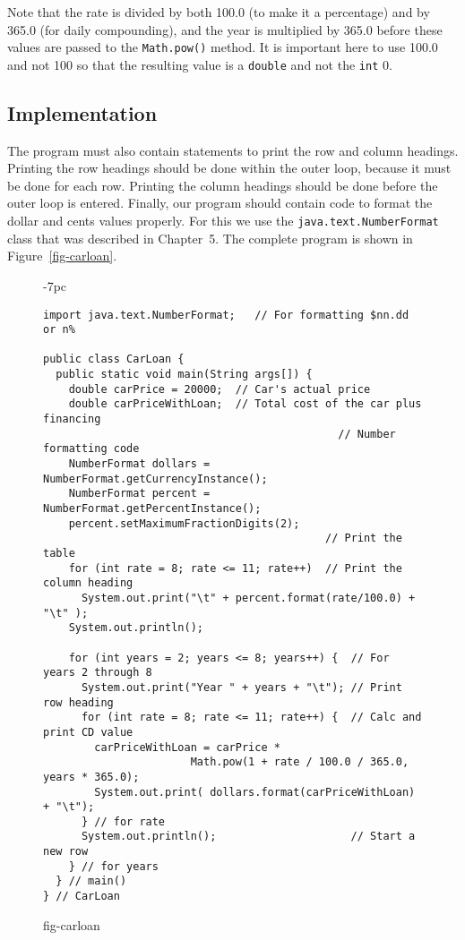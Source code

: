 \noindent Note that the rate is divided by both 100.0 (to make it
a percentage) and by 365.0 (for daily compounding), and the year
is multiplied by 365.0 before these values are passed to the
{\tt Math.pow()} method.   It is important here to use 100.0 and
not 100 so that the resulting value is a {\tt double} and not
the {\tt int} 0.

\subsection*{Implementation}
\noindent The program must also contain statements to print the row and column
headings.  Printing the row headings should be done within the outer
loop, because it must be done for each row.  Printing the column
headings should be done before the outer loop is entered.  Finally, our
program should contain code to format the dollar and cents values
properly.  For this we use the {\tt java.text.NumberFormat} class that
was described in Chapter~5. The complete program is shown in
Figure~\ref{fig-carloan}.
\begin{figure}[h]
\jjjprogstart
\begin{jjjlistingleft}[33pc]{-7pc}
\begin{lstlisting}
import java.text.NumberFormat;   // For formatting $nn.dd or n%

public class CarLoan {
  public static void main(String args[]) {
    double carPrice = 20000;  // Car's actual price
    double carPriceWithLoan;  // Total cost of the car plus financing
                                              // Number formatting code
    NumberFormat dollars = NumberFormat.getCurrencyInstance(); 
    NumberFormat percent = NumberFormat.getPercentInstance();
    percent.setMaximumFractionDigits(2);
                                            // Print the table
    for (int rate = 8; rate <= 11; rate++)  // Print the column heading
      System.out.print("\t" + percent.format(rate/100.0) + "\t" );
    System.out.println();

    for (int years = 2; years <= 8; years++) {  // For years 2 through 8
      System.out.print("Year " + years + "\t"); // Print row heading
      for (int rate = 8; rate <= 11; rate++) {  // Calc and print CD value
        carPriceWithLoan = carPrice * 
                       Math.pow(1 + rate / 100.0 / 365.0, years * 365.0);
        System.out.print( dollars.format(carPriceWithLoan)  + "\t");
      } // for rate
      System.out.println();                     // Start a new row
    } // for years
  } // main()
} // CarLoan
\end{lstlisting}
\end{jjjlistingleft}
{fig-carloan}
\end{figure}


